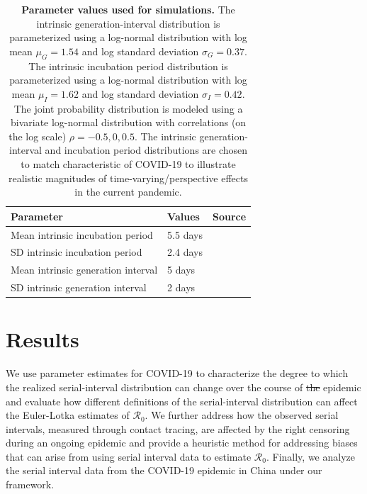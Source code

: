 \documentclass[12pt]{article}
\newcommand{\Rx}[1]{\ensuremath{{\mathcal R}_{#1}}\xspace}
\newcommand{\Ro}{\Rx{0}}
\providecommand{\DIFaddtex}[1]{{\protect\color{blue}\uwave{#1}}} %
\providecommand{\DIFdeltex}[1]{{\protect\color{red}\sout{#1}}}                      %
\providecommand{\DIFaddbegin}{} %
\providecommand{\DIFaddend}{} %
\providecommand{\DIFdelbegin}{} %
\providecommand{\DIFdelend}{} %
\providecommand{\DIFaddFL}[1]{\DIFadd{#1}} %
\providecommand{\DIFdelFL}[1]{\DIFdel{#1}} %
\providecommand{\DIFaddbeginFL}{} %
\providecommand{\DIFaddendFL}{} %
\providecommand{\DIFdelbeginFL}{} %
\providecommand{\DIFdelendFL}{} %
\providecommand{\DIFadd}[1]{\texorpdfstring{\DIFaddtex{#1}}{#1}} %
\providecommand{\DIFdel}[1]{\texorpdfstring{\DIFdeltex{#1}}{}} %
\newcommand{\DIFscaledelfig}{0.5}
\newlength{\DIFdelgraphicswidth} %
\newlength{\DIFdelgraphicsheight} %
\newcommand{\DIFaddincludegraphics}[2][]{{\color{blue}\fbox{\DIFOincludegraphics[#1]{#2}}}} %
\newcommand{\DIFdelincludegraphics}[2][]{%
\sbox{\DIFdelgraphicsbox}{\DIFOincludegraphics[#1]{#2}}%
\settoboxwidth{\DIFdelgraphicswidth}{\DIFdelgraphicsbox} %
\settoboxtotalheight{\DIFdelgraphicsheight}{\DIFdelgraphicsbox} %
\scalebox{\DIFscaledelfig}{%
\parbox[b]{\DIFdelgraphicswidth}{\usebox{\DIFdelgraphicsbox}\\[-\baselineskip] \rule{\DIFdelgraphicswidth}{0em}}\llap{\resizebox{\DIFdelgraphicswidth}{\DIFdelgraphicsheight}{%
\setlength{\unitlength}{\DIFdelgraphicswidth}%
\begin{picture}(1,1)%
\thicklines\linethickness{2pt} %
{\color[rgb]{1,0,0}\put(0,0){\framebox(1,1){}}}%
{\color[rgb]{1,0,0}\put(0,0){\line( 1,1){1}}}%
{\color[rgb]{1,0,0}\put(0,1){\line(1,-1){1}}}%
\end{picture}%
}\hspace*{3pt}}} %
} %
\DeclareRobustCommand{\DIFaddbegin}{\DIFOaddbegin \let\includegraphics\DIFaddincludegraphics} %
\DeclareRobustCommand{\DIFaddend}{\DIFOaddend \let\includegraphics\DIFOincludegraphics} %
\DeclareRobustCommand{\DIFdelbegin}{\DIFOdelbegin \let\includegraphics\DIFdelincludegraphics} %
\DeclareRobustCommand{\DIFdelend}{\DIFOaddend \let\includegraphics\DIFOincludegraphics} %
\DeclareRobustCommand{\DIFaddbeginFL}{\DIFOaddbeginFL \let\includegraphics\DIFaddincludegraphics} %
\DeclareRobustCommand{\DIFaddendFL}{\DIFOaddendFL \let\includegraphics\DIFOincludegraphics} %
\DeclareRobustCommand{\DIFdelbeginFL}{\DIFOdelbeginFL \let\includegraphics\DIFdelincludegraphics} %
\DeclareRobustCommand{\DIFdelendFL}{\DIFOaddendFL \let\includegraphics\DIFOincludegraphics} %
\begin{document}
\begin{table}[!ht]
\begin{center}
\begin{tabular}{|l|l|r|}
\hline
Parameter & Values & Source\\
\hline
Mean intrinsic incubation period & 5.5 days & \cite{lauer2020incubation} \\
SD intrinsic incubation period & 2.4 days & \cite{lauer2020incubation} \\
Mean intrinsic generation interval & 5 days & \cite{ferretti2020quantifying} \\
SD intrinsic generation interval & 2 days & \cite{ferretti2020quantifying} \\
\hline
\end{tabular}
\end{center}
\caption{
  \textbf{Parameter values used for simulations.}
The intrinsic generation-interval distribution is parameterized using a log-normal distribution with log mean $\mu_G=1.54$ and log standard deviation $\sigma_G=0.37$.
The intrinsic incubation period distribution is parameterized using a log-normal distribution with log mean $\mu_I=1.62$ and log standard deviation $\sigma_I=0.42$.
The joint probability distribution is modeled using a bivariate log-normal distribution with correlations (on the log scale) \DIFdelbeginFL \DIFdelFL{$\rho=-0.5, 0, 0.5$}\DIFdelendFL \DIFaddbeginFL \DIFaddFL{$\rho=0, 0.25, 0.5, 0.75$}\DIFaddendFL .
The intrinsic generation-interval and incubation period distributions are chosen to match characteristic of COVID-19 to illustrate realistic magnitudes of time-varying/perspective effects in the current pandemic.
}
\end{table}

\section{Results}

We use parameter estimates for COVID-19 to characterize the degree to which the realized serial-interval distribution can change over the course of \DIFdelbegin \DIFdel{the }\DIFdelend \DIFaddbegin \DIFadd{an }\DIFaddend epidemic and evaluate how different definitions of the serial-interval distribution can affect the Euler-Lotka estimates of \Ro.
We further address how the observed serial intervals, measured through contact tracing, are affected by the right censoring during an ongoing epidemic and provide a heuristic method for addressing biases that can arise from using serial interval data to estimate \Ro.
Finally, we analyze the serial interval data from the COVID-19 epidemic in China under our framework.
\end{document}
